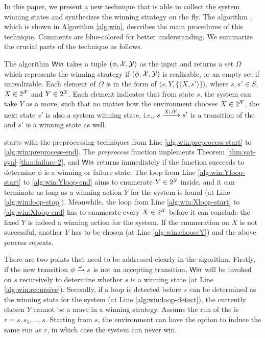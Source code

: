 In this paper, we present a new technique that is able to collect the system winning states and synthesizes the winning strategy on the fly. The algorithm \tool, which is shown in Algorithm \ref{alg:win}, describes the main procedures of this technique. Comments are blue-colored for better understanding. We summarize the crucial parts of the technique as follows.

The algorithm ${\sf Win}$ takes a tuple $(\phi, \mathcal{X}, \mathcal{Y})$ as the input and returns a set $\Omega$ which represents the winning strategy  if $(\phi, \mathcal{X}, \mathcal{Y})$ is realizable, or an empty set if unrealizable. Each element of $\Omega$ is in the form of $\langle s, Y, \{\langle X, s'\rangle\}\rangle$, where $s,s'\in S$, $X\in 2^{\mathcal{X}}$ and $Y\in 2^{\mathcal{Y}}$. Each element indicates that from state $s$, the system can take $Y$ as a move, such that no matter how the environment chooses $X \in 2^{\mathcal{X}}$, the next state $s'$ is also a system winning state, i.e., $s\xrightarrow[]{X\cup Y}s'$ is a transition of the \tdfa and $s'$ is a winning state as well.

\tool starts with the preprocessing techniques from Line \ref{alg:win:preprocess-start} to \ref{alg:win:preprocess-end}. The \emph{preprocess} function implements Theorem \ref{thm:sat-syn}-\ref{thm:failure-2}, and ${\sf Win}$ returns immediately if the function succeeds to determine $\phi$ is a winning or failure state. The loop from Line \ref{alg:win:Yloop-start} to \ref{alg:win:Yloop-end} aims to enumerate $Y\in 2^{\mathcal{Y}}$ inside, and it can terminate as long as a winning action $Y$ for the system is found (at Line \ref{alg:win:loop-stop}). Meanwhile, the loop from Line \ref{alg:win:Xloop-start} to \ref{alg:win:Xloop-end} has to enumerate every $X\in 2^{\mathcal{X}}$ before it can conclude the fixed $Y$ is indeed a winning action for the system. If the enumeration on $X$ is not successful, another $Y$ has to be chosen (at Line \ref{alg:win:chooseY}) and the above process repeats.

There are two points that need to be addressed clearly in the algorithm. Firstly, if the new transition $\phi\xrightarrow[]{\omega}s$ is not an accepting transition, ${\sf Win}$ will be invoked on $s$ recursively to determine whether $s$ is a winning state (at Line \ref{alg:win:recursive}). Secondly, if a loop is detected before $s$ can be determined as the winning state for the system (at Line \ref{alg:win:loop-detect}), the currently chosen $Y$ cannot be a move in a winning strategy.  Assume the run of the \tdfa is $r=s,s_1,\ldots, s$. Starting from $s$, the environment can have the option to induce the same run as $r$, in which case the system can never win.  


